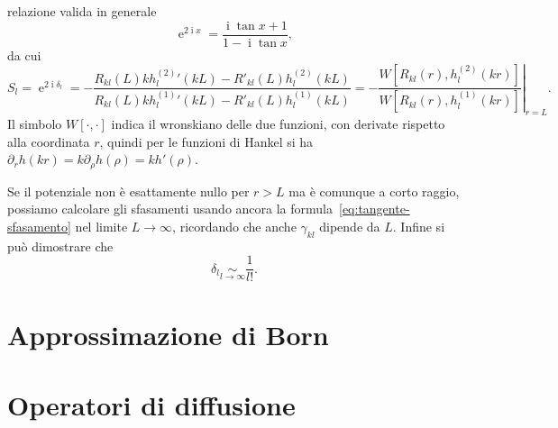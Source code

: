 \documentclass[a4paper,fleqn,twoside,12pt]{article}
\DeclareMathOperator{\e}{\mathrm{e}} %
\DeclareMathOperator{\uimm}{\mathrm{i}} %
\begin{document}
relazione valida in generale
\begin{equation}
  \e^{2\uimm x} = \frac{\uimm \tan x + 1}{1 - \uimm \tan x},
\end{equation}
da cui
\begin{equation}
  S_{l} = \e^{2\uimm\delta_{l}} = -\frac{R_{kl}(L)k h_{l}^{(2)}{}'(kL) -
    R'_{kl}(L)h_{l}^{(2)}(kL)}{R_{kl}(L)k h_{l}^{(1)}{}'(kL) -
    R'_{kl}(L)h_{l}^{(1)}(kL)} = -\left.\frac{W[R_{kl}(r),
      h_{l}^{(2)}(kr)]}{W[R_{kl}(r), h_{l}^{(1)}(kr)]}\right|_{r = L}.
\end{equation}
Il simbolo $W[\cdot,\cdot]$ indica il wronskiano delle due funzioni, con
derivate rispetto alla coordinata $r$, quindi per le funzioni di Hankel si ha
$\partial_{r}h(kr) = k \partial_{\rho}h(\rho) = k h'(\rho)$.

Se il potenziale non è esattamente nullo per $r > L$ ma è comunque a corto
raggio, possiamo calcolare gli sfasamenti usando ancora la
formula~\eqref{eq:tangente-sfasamento} nel limite $L \to \infty$, ricordando che
anche $\gamma_{kl}$ dipende da $L$.  Infine si può dimostrare che
\begin{equation}
  \delta_{l} \underset{l \to \infty}{\sim} \frac{1}{l!}.
\end{equation}


\section{Approssimazione di Born}
\label{sec:approx-born}

\section{Operatori di diffusione}
\label{sec:operatori-diffusione}

{}
\nocite{*}
\printbibliography
\end{document}

